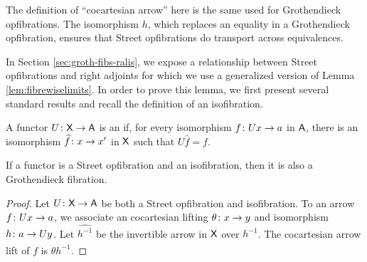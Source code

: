 \documentclass{amsart}
\begin{document}
\begin{figure}
\end{figure}

The definition of ``cocartesian arrow'' here is the same used for
Grothendieck opfibrations. The isomorphism $ h $, which replaces an
equality in a Grothendieck opfibration, ensures that Street
opfibrations do transport across equivalences. 

In Section \ref{sec:groth-fibs-ralis}, we expose a relationship
between Street opfibrations and right adjoints for which we use a
generalized version of Lemma \ref{lem:fibrewiselimits}. In order to
prove this lemma, we first present several standard results and recall
the definition of an isofibration.

\begin{defn}
  A functor $U \colon \mathsf{X} \to \mathsf{A}$ is an  if, for
  every isomorphism $f \colon Ux \to a$ in $\mathsf{A}$, there is an
  isomorphism $\widehat{f} \colon x \to x'$ in $\mathsf{X}$ such that $U\hat{f}=f$.
\end{defn}

\begin{lem} \label{lem:street_and_iso_is_groth} If a functor is a
  Street opfibration and an isofibration, then it is also a
  Grothendieck fibration.
\end{lem}

\begin{proof}
  Let $U \colon\mathsf{X} \to \mathsf{A}$ be both a Street opfibration and
  isofibration. To an arrow $f \colon Ux \to a$, we associate an
  cocartesian lifting $\theta \colon x \to y$ and isomorphism
  $h \colon a \to Uy$. Let $\hat{h^{-1}}$ be the invertible arrow in
  $\mathsf{X}$ over $h^{-1}$. The cocartesian arrow lift of $f$ is
  $\theta \hat{h^{-1}}$.
\end{proof}
\end{document}
